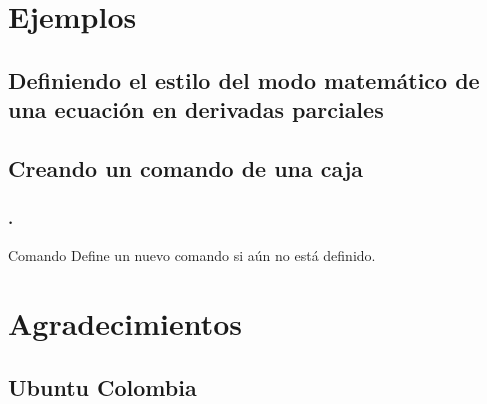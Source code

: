 \documentclass[12pt]{beamer}
\begin{document}
\section{Ejemplos}
\subsection{Definiendo el estilo del modo matemático de una ecuación en derivadas parciales}

\subsection{Creando un comando de una caja}

\begin{frame}
\frametitle{\thesection.}
\begin{alertblock}{Comando }
Define un nuevo comando si aún no está definido.
\end{alertblock}
\end{frame}
\section{Agradecimientos}
\subsection{Ubuntu Colombia}
 
\end{document}
